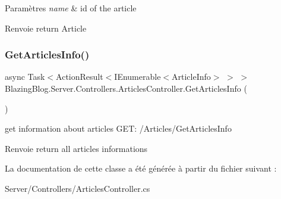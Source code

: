 \begin{DoxyParams}{Paramètres}
{\em name} & id of the article\\
\hline
\end{DoxyParams}
\begin{DoxyReturn}{Renvoie}
return Article
\end{DoxyReturn}
\mbox{\label{class_blazing_blog_1_1_server_1_1_controllers_1_1_articles_controller_a9970ba338169d8ef258c10663bf211b1}} 
\subsubsection{\texorpdfstring{Get\+Articles\+Info()}{GetArticlesInfo()}}
{\footnotesize\ttfamily async Task$<$Action\+Result$<$I\+Enumerable$<$Article\+Info$>$ $>$ $>$ Blazing\+Blog.\+Server.\+Controllers.\+Articles\+Controller.\+Get\+Articles\+Info (\begin{DoxyParamCaption}{ }\end{DoxyParamCaption})\hspace{0.3cm}{\ttfamily [inline]}}



get information about articles G\+ET\+: /\+Articles/\+Get\+Articles\+Info 

\begin{DoxyReturn}{Renvoie}
return all articles informations
\end{DoxyReturn}


La documentation de cette classe a été générée à partir du fichier suivant \+:\begin{DoxyCompactItemize}
\item 
Server/\+Controllers/Articles\+Controller.\+cs\end{DoxyCompactItemize}
